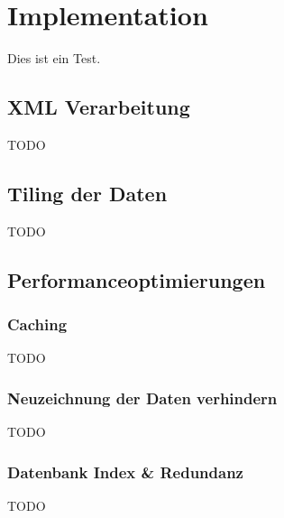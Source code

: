 
\chapter{Implementation}
Dies ist ein Test. \cite{Matthews201111}
\section{XML Verarbeitung}
\begin{flushleft}
TODO
\end{flushleft}
\section{Tiling der Daten}
\begin{flushleft}
TODO
\end{flushleft}
\section{Performanceoptimierungen}
\subsection{Caching}
\begin{flushleft}
TODO
\end{flushleft}
\subsection{Neuzeichnung der Daten verhindern}
\begin{flushleft}
TODO
\end{flushleft}
\subsection{Datenbank Index \& Redundanz}
\begin{flushleft}
TODO
\end{flushleft}